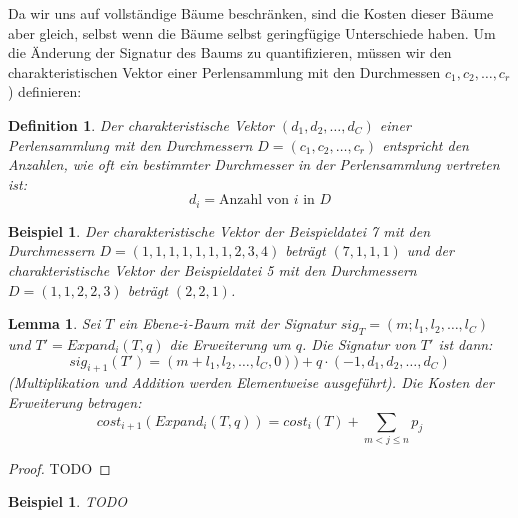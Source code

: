 \documentclass[a4paper,10pt,ngerman]{scrartcl}
\newtheorem{definition}[satz]{Definition}
\newtheorem{lemma}[satz]{Lemma}
\newtheorem{beispiel}[satz]{Beispiel}
\begin{document}
    Da wir uns auf vollständige Bäume beschränken, sind die Kosten dieser Bäume aber gleich, selbst wenn die Bäume selbst geringfügige Unterschiede haben.
    Um die Änderung der Signatur des Baums zu quantifizieren, müssen wir den charakteristischen Vektor einer Perlensammlung mit den Durchmessen $c_1, c_2, \dots, c_r$) definieren:
    \begin{definition}
        Der charakteristische Vektor $(d_1, d_2, \dots, d_C)$ einer Perlensammlung mit den Durchmessern $D = (c_1, c_2, \dots, c_r)$ entspricht den Anzahlen, wie oft ein bestimmter Durchmesser in der Perlensammlung vertreten ist:
        \[d_i = \text{Anzahl von $i$ in $D$}\]
    \end{definition}
    \begin{beispiel}
        Der charakteristische Vektor der Beispieldatei 7 mit den Durchmessern $D = (1, 1, 1, 1, 1, 1, 1, 2, 3, 4)$ beträgt $(7, 1, 1, 1)$ und der charakteristische Vektor der Beispieldatei 5 mit den Durchmessern $D = (1, 1, 2, 2, 3)$ beträgt $(2, 2, 1)$.
    \end{beispiel}
    \begin{lemma}
        Sei $T$ ein Ebene-$i$-Baum mit der Signatur $sig_T = (m;l_1,l_2,\dots,l_C)$ und $T' = Expand_i(T,q)$ die Erweiterung um $q$. Die Signatur von $T'$ ist dann: \[sig_{i+1}(T') = (m + l_1, l_2, \dots, l_C, 0)) + q \cdot (-1, d_1, d_2, \dots, d_C)\]
        (Multiplikation und Addition werden Elementweise ausgeführt). Die Kosten der Erweiterung betragen:
        \[cost_{i+1}(Expand_i(T,q)) = cost_i(T) + \sum_{m < j \le n}p_j\]
    \end{lemma}
    \begin{proof}
        TODO
    \end{proof}
    \begin{beispiel}
        TODO
    \end{beispiel}
\end{document}
